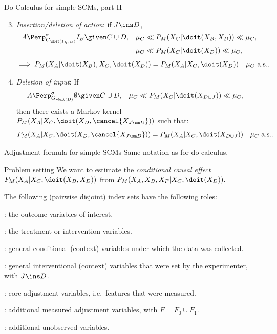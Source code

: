 \begin{frame}{Do-Calculus for simple SCMs, part II}
  \begin{Thm}
  \small
  \begin{enumerate}
     \setcounter{enumi}{2}
     \item \emph{Insertion/deletion of action}: if $J \ins D$,
       \begin{align*} 
           A &\Perp^\sigma_{G_{\doit(I_B,D)}} I_B \given C  \cup D, &          
           \mu_C &\ll P_M(X_C|\doit(X_B,X_{D})) \ll \mu_C, \\
                 && \mu_C &\ll P_M(X_C|\doit(X_{D})) \ll \mu_C,
       \end{align*}
       \[ \implies  P_M(X_A|\doit(X_B),X_C,\doit(X_{D})) = P_M(X_A|X_C,\doit(X_{D})) \quad \mu_C\text{-a.s.}.\]
     \item \emph{Deletion of input}: 
         If 
         \begin{align*} 
           A &\Perp^\sigma_{G_{\doit(D)}} \emptyset \given C \cup D, &
             \mu_C &\ll P_M(X_C|\doit(X_{D\cup J})) \ll \mu_C,
         \end{align*}
         then there exists a Markov kernel $P_M(X_A|X_C,\doit(X_{D},\cancel{X_{J\sm D}}))$ such that:
         \[ P_M(X_A|X_C,\doit(X_{D},\cancel{X_{J\sm D}})) = P_M(X_A|X_C,\doit(X_{D \cup J})) \quad \mu_C\text{-a.s.}. \]
    \end{enumerate}
\end{Thm}
\end{frame}

\begin{frame}{Adjustment formula for simple SCMs}
Same notation as for do-calculus.
\begin{block}{Problem setting}
We want to estimate the \emph{conditional causal effect}
$P_{M}(X_A|X_C,\doit(X_B,X_D))$
from
$P_{M}(X_A,X_B,X_F|X_C,\doit(X_D)).$
\end{block}
The following (pairwise disjoint) index sets have the following roles:\\
\begin{description}\small
  \item[$A$]: the outcome variables of interest.
  \item[$B$]: the treatment or intervention variables.
  \item[$C$]: general conditional (context) variables under which the data was collected.
  \item[$D$]: general interventional (context) variables that were set by the experimenter, with $J \ins D$.
  \item[$F_0$]: core adjustment variables, i.e.\ features that were measured.
  \item[$F_1$]: additional measured adjustment variables, with $F = F_0 \cup F_1$.
  \item[$H$]: additional unobserved variables.
\end{description}
\end{frame}

